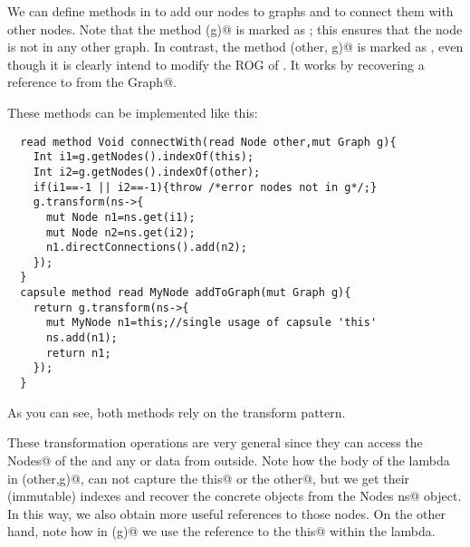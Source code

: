 We can define methods in \Q@MyNode@ to add our nodes
to graphs and to connect them with other nodes.
Note that the method \Q@addToGraph(g)@ is marked as \Q@capsule@; this ensures that the node is not in any other graph.
In contrast, the method \Q@connectWith(other, g)@ is marked as \Q@read@, even though it is clearly intend to modify the ROG of \Q@this@.
It works by recovering a \Q@mut@ reference to \Q@this@ from the \Q@mut Graph@.

These methods can be implemented like this:
\begin{lstlisting}
  read method Void connectWith(read Node other,mut Graph g){
    Int i1=g.getNodes().indexOf(this);
    Int i2=g.getNodes().indexOf(other);
    if(i1==-1 || i2==-1){throw /*error nodes not in g*/;}
    g.transform(ns->{
      mut Node n1=ns.get(i1);
      mut Node n2=ns.get(i2);
      n1.directConnections().add(n2);
    });
  }
  capsule method read MyNode addToGraph(mut Graph g){
    return g.transform(ns->{
      mut MyNode n1=this;//single usage of capsule 'this'
      ns.add(n1);
      return n1;
    });
  }
\end{lstlisting}
As you can see, both methods rely on the transform pattern.

These transformation operations are very general since they
can access the \Q@mut Nodes@ of the \Q@Graph@ and 
any \Q@capsule@ or \Q@imm@ data from outside.
Note how the body of the \Q@imm@ lambda in \Q@connectWith(other,g)@, can not capture the \Q@read this@ or the \Q@read other@, but we get their (immutable) indexes 
and recover the concrete objects from the \Q@mut Nodes ns@ object.
In this way, we also obtain more useful \Q@mut@ references to those nodes.
On the other hand, note how in \Q@addToGraph(g)@ we use the reference to the \Q@capsule this@ within the lambda.